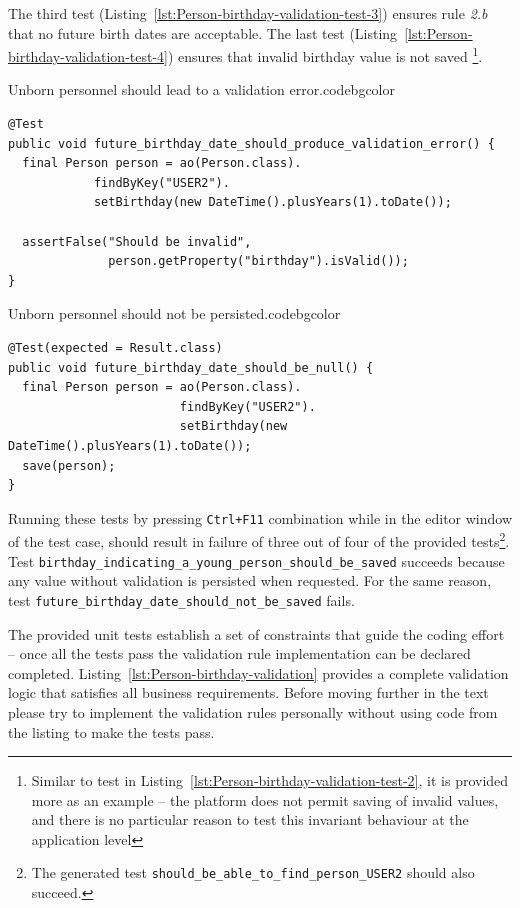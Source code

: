   The third test (Listing~\ref{lst:Person-birthday-validation-test-3}) ensures rule \emph{2.b} that no future birth dates are acceptable.
  The last test (Listing~\ref{lst:Person-birthday-validation-test-4}) ensures that invalid birthday value is not saved
  \footnote{Similar to test in Listing~\ref{lst:Person-birthday-validation-test-2}, it is provided more as an example -- the platform does not permit saving of invalid values, and there is no particular reason to test this invariant behaviour at the application level}.

\begin{code}{Unborn personnel should lead to a validation error.}{\label{lst:Person-birthday-validation-test-3}}{codebgcolor}
    \begin{lstlisting}
@Test
public void future_birthday_date_should_produce_validation_error() {	
  final Person person = ao(Person.class).
			findByKey("USER2").
			setBirthday(new DateTime().plusYears(1).toDate());	

  assertFalse("Should be invalid", 
              person.getProperty("birthday").isValid());
}
    \end{lstlisting}
  \end{code}

\begin{code}{Unborn personnel should not be persisted.}{\label{lst:Person-birthday-validation-test-4}}{codebgcolor}
    \begin{lstlisting}
@Test(expected = Result.class)
public void future_birthday_date_should_be_null() {
  final Person person = ao(Person.class).
                        findByKey("USER2").
                        setBirthday(new DateTime().plusYears(1).toDate());
  save(person);
}
    \end{lstlisting}
  \end{code}

  Running these tests by pressing \texttt{Ctrl+F11} combination while in the editor window of the test case, should result in failure of three out of four of the provided tests\footnote{The generated test \texttt{should\_be\_able\_to\_find\_person\_USER2} should also succeed.}.
  Test \texttt{birthday\_indicating\_a\_young\_person\_should\_be\_saved} succeeds because any value without validation is persisted when requested.
  For the same reason, test \texttt{future\_birthday\_date\_should\_not\_be\_saved} fails.

  The provided unit tests establish a set of constraints that guide the coding effort -- once all the tests pass the validation rule implementation can be declared completed.
  Listing~\ref{lst:Person-birthday-validation} provides a complete validation logic that satisfies all business requirements.
  Before moving further in the text please try to implement the validation rules personally without using code from the listing to make the tests pass.


